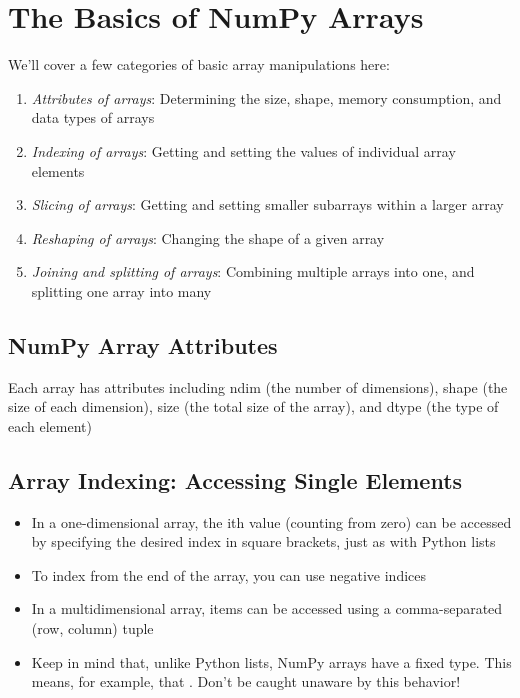 \chapter{The Basics of NumPy Arrays}
We'll cover a few categories of basic array manipulations here:
\begin{enumerate}
    \item \emph{Attributes of arrays}: Determining the size, shape, memory consumption, and data types of arrays
    \item \emph{Indexing of arrays}: Getting and setting the values of individual array elements
    \item \emph{Slicing of arrays}: Getting and setting smaller subarrays within a larger array
    \item \emph{Reshaping of arrays}: Changing the shape of a given array
    \item \emph{Joining and splitting of arrays}: Combining multiple arrays into one, and splitting one array into many
\end{enumerate}

\section{NumPy Array Attributes}
Each array has attributes including ndim (the number of dimensions), shape (the size of each dimension), size (the total size of the array), and dtype (the type of each element)

\section{Array Indexing: Accessing Single Elements}
\begin{itemize}
    \item In a one-dimensional array, the ith value (counting from zero) can be accessed by specifying the desired index in square brackets, just as with Python lists
    \item To index from the end of the array, you can use negative indices
    \item In a multidimensional array, items can be accessed using a comma-separated (row, column) tuple
    \item Keep in mind that, unlike Python lists, NumPy arrays have a fixed type. This means, for example, that . Don't be caught unaware by this behavior!
\end{itemize}

